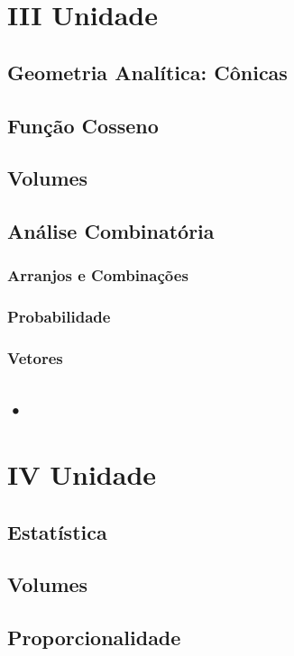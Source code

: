 \documentclass[12pt,a4paper]{book}
\begin{document}
\part*{III Unidade}

\chapter{Geometria Analítica: Cônicas}

\chapter{Função Cosseno}

\chapter{Volumes}

\chapter{Análise Combinatória}
	\section{Arranjos e Combinações}
	\section{Probabilidade}

\section{Vetores}

\chapter{•}
\part*{IV Unidade}

\chapter{Estatística}

\chapter{Volumes}

\chapter{Proporcionalidade}
\end{document}
